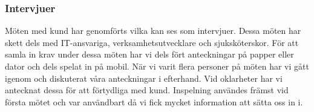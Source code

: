 \subsubsection{Intervjuer}
Möten med kund har genomförts vilka kan ses som intervjuer. Dessa möten har skett dels med IT-ansvariga, verksamhetsutvecklare och sjuksköterskor. För att samla in krav under dessa möten har vi dels fört anteckningar på papper eller dator och dels spelat in på mobil. När vi varit flera personer på möten har vi gått igenom och diskuterat våra anteckningar i efterhand. Vid oklarheter har vi antecknat dessa för att förtydliga med kund. Inspelning användes främst vid första mötet och var användbart då vi fick mycket information att sätta oss in i. 




